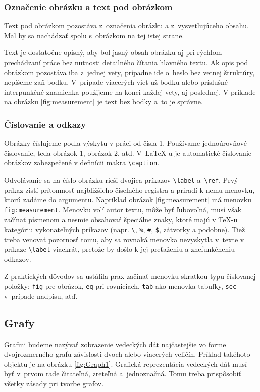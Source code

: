 \subsubsection{Označenie obrázku a text pod obrázkom}
Text pod obrázkom pozostáva z~označenia obrázku a z~vysvetľujúceho obsahu.
Mal by sa nachádzať spolu s~obrázkom na tej istej strane.

Text je dostatočne opisný,
aby bol jasný obsah obrázku aj pri rýchlom prechádzaní
práce bez nutnosti detailného čítania hlavného textu.
Ak opis pod obrázkom pozostáva iba z~jednej vety,
prípadne ide o~heslo bez vetnej štruktúry,
nepíšeme zaň bodku.
V~prípade viacerých viet už bodku alebo príslušné interpunkčné
znamienka použijeme na konci každej vety,
aj poslednej.
V príklade na obrázku \ref{fig:measurement} je text bez bodky
a~to je správne.

\subsubsection{Číslovanie a odkazy}
Obrázky číslujeme podľa výskytu v práci od čísla 1.
Používame jednoúrovňové číslovanie,
teda obrázok 1, obrázok 2, atď.
V~\LaTeX-u je automatické číslovanie obrázkov zabezpečené v definícii makra \verb|\caption|.

Odvolávanie sa na číslo obrázku rieši dvojica príkazov \verb|\label| a~\verb|\ref|.
Prvý príkaz zistí prítomnosť najbližšieho číselného
registra a priradí k nemu menovku, ktorú zadáme do argumentu.
Napríklad obrázok \ref{fig:measurement} má menovku \verb|fig:measurement|. Menovku volí autor textu, môže byť ľubovoľná, musí však začínať písmenom a nesmie obsahovať špeciálne znaky, ktoré majú v \TeX-u kategóriu vykonateľných príkazov (napr. \verb|\|, \verb|%|, \verb|#|, \verb|$|, zátvorky a podobne). Tiež treba venovať pozornosť tomu, aby sa rovnaká menovka nevyskytla v~texte v príkaze \verb|\label| viackrát, pretože by došlo k jej preťaženiu a znefunkčneniu odkazov.

Z praktických dôvodov sa ustálila prax začínať menovku skratkou typu číslovanej položky: \verb|fig| pre obrázok, \verb|eq| pri rovniciach, \verb|tab| ako menovka tabuľky, \verb|sec| v~prípade nadpisu, atď.

\subsection{Grafy}
Grafmi budeme nazývať zobrazenie vedeckých dát
najčastejšie vo forme dvojrozmerného grafu
závislosti dvoch alebo viacerých veličín.
Príklad takéhoto objektu je na obrázku \ref{fig:Graph1}.
Grafická reprezentácia vedeckých dát musí byť
v~prvom rade čitateľná, zreteľná a~jednoznačná.
Tomu treba prispôsobiť všetky zásady pri tvorbe grafov.


